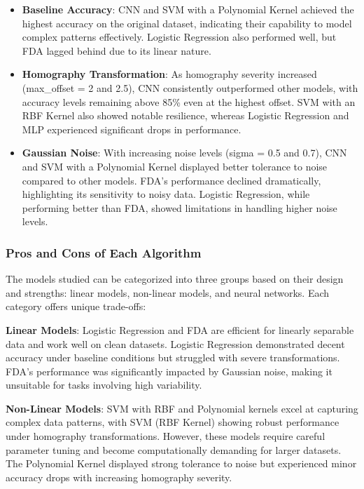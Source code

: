 \documentclass{article}
\begin{document}
\begin{itemize}
    \item \textbf{Baseline Accuracy}: CNN and SVM with a Polynomial Kernel achieved the highest accuracy on the original dataset, indicating their capability to model complex patterns effectively. Logistic Regression also performed well, but FDA lagged behind due to its linear nature.
    \item \textbf{Homography Transformation}: As homography severity increased (max\_offset = 2 and 2.5), CNN consistently outperformed other models, with accuracy levels remaining above 85\% even at the highest offset. SVM with an RBF Kernel also showed notable resilience, whereas Logistic Regression and MLP experienced significant drops in performance.
    \item \textbf{Gaussian Noise}: With increasing noise levels (sigma = 0.5 and 0.7), CNN and SVM with a Polynomial Kernel displayed better tolerance to noise compared to other models. FDA's performance declined dramatically, highlighting its sensitivity to noisy data. Logistic Regression, while performing better than FDA, showed limitations in handling higher noise levels.
\end{itemize}

\subsubsection{Pros and Cons of Each Algorithm}
The models studied can be categorized into three groups based on their design and strengths: linear models, non-linear models, and neural networks. Each category offers unique trade-offs:

\textbf{Linear Models}: Logistic Regression and FDA are efficient for linearly separable data and work well on clean datasets. Logistic Regression demonstrated decent accuracy under baseline conditions but struggled with severe transformations. FDA's performance was significantly impacted by Gaussian noise, making it unsuitable for tasks involving high variability.

\textbf{Non-Linear Models}: SVM with RBF and Polynomial kernels excel at capturing complex data patterns, with SVM (RBF Kernel) showing robust performance under homography transformations. However, these models require careful parameter tuning and become computationally demanding for larger datasets. The Polynomial Kernel displayed strong tolerance to noise but experienced minor accuracy drops with increasing homography severity.
\end{document}

